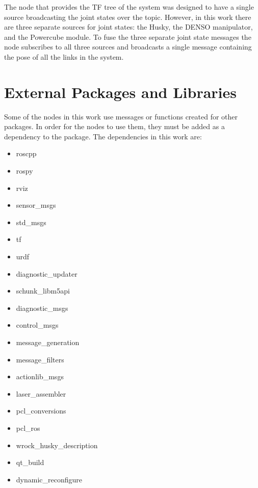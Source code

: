 The  node that provides the TF tree of the system was designed to have a single source broadcasting the joint states over the  topic. However, in this work there are three separate sources for joint states: the Husky, the DENSO manipulator, and the Powercube module. To fuse the three separate joint state messages the  node subscribes to all three sources and broadcasts a single message containing the pose of all the links in the system.\\
\section{External Packages and Libraries}
\label{sec:extpkg}
Some of the nodes in this work use messages or functions created for other packages. In order for the nodes to use them, they must be added as a dependency to the package. The dependencies in this work are:

\begin{itemize}
\item roscpp
\item rospy
\item rviz
\item sensor\_msgs
\item std\_msgs
\item tf
\item urdf 
\item diagnostic\_updater
\item schunk\_libm5api
\item diagnostic\_msgs
\item control\_msgs
\item message\_generation
\item message\_filters
\item actionlib\_msgs
\item laser\_assembler
\item pcl\_conversions 
\item pcl\_ros 
\item wrock\_husky\_description
\item qt\_build
\item dynamic\_reconfigure
\end{itemize}
